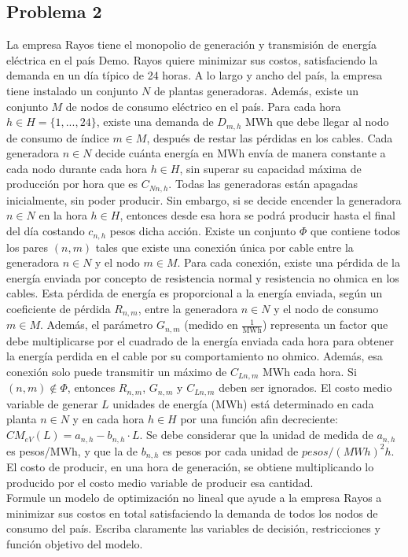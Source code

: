 \documentclass{article}
\begin{document}
\begin{flushleft}
		\section{Problema 2}
		La empresa Rayos tiene el monopolio de generación y transmisión de energía eléctrica en el país Demo. Rayos quiere minimizar sus costos, satisfaciendo la demanda en un día típico de 24 horas. A lo largo y ancho del país, la empresa tiene instalado un conjunto $N$ de plantas generadoras. Además, existe un conjunto $M$ de nodos de consumo eléctrico en el país. Para cada hora $h \in H = \{1, ..., 24\}$, existe una demanda de $D_{m,h}$ MWh que debe llegar al nodo de consumo de índice $m \in M$, después de restar las pérdidas en los cables. Cada generadora $n \in N$ decide cuánta energía en MWh envía de manera constante a cada nodo durante cada hora $h \in H$, sin superar su capacidad máxima de producción por hora que es $C_{Nn,h}$. Todas las generadoras están apagadas inicialmente, sin poder producir. Sin embargo, si se decide encender la generadora $n \in N$ en la hora $h \in H$, entonces desde esa hora se podrá producir hasta el final del día costando $c_{n,h}$ pesos dicha acción. Existe un conjunto $\Phi$ que contiene todos los pares $(n, m)$ tales que existe una conexión única por cable entre la generadora $n \in N$ y el nodo $m \in M$. Para cada conexión, existe una pérdida de la energía enviada por concepto de resistencia normal y resistencia no ohmica en los cables. Esta pérdida de energía es proporcional a la energía enviada, según un coeficiente de pérdida $R_{n,m}$, entre la generadora $n \in N$ y el nodo de consumo $m \in M$. Además, el parámetro $G_{n,m}$ (medido en $\frac{1}{\text{MWh}}$) representa un factor que debe multiplicarse por el cuadrado de la energía enviada cada hora para obtener la energía perdida en el cable por su comportamiento no ohmico. Además, esa conexión solo puede transmitir un máximo de $C_{Ln,m}$ MWh cada hora. Si $(n, m) \notin \Phi$, entonces $R_{n,m}$, $G_{n,m}$ y $C_{Ln,m}$ deben ser ignorados. El costo medio variable de generar $L$ unidades de energía (MWh) está determinado en cada planta $n \in N$ y en cada hora $h \in H$ por una función afin decreciente: $CM_{eV}(L) = a_{n,h} - b_{n,h} \cdot L$. Se debe considerar que la unidad de medida de $a_{n,h}$ es pesos/MWh, y que la de $b_{n,h}$ es pesos por cada unidad de $pesos/(MWh)^2h$. El costo de producir, en una hora de generación, se obtiene multiplicando lo producido por el costo medio variable de producir esa cantidad.\\
		\vspace{5mm}
		Formule un modelo de optimización no lineal que ayude a la empresa Rayos a minimizar sus costos en total satisfaciendo la demanda de todos los nodos de consumo del país. Escriba claramente las variables de decisión, restricciones y función objetivo del modelo.\\
		

\end{flushleft}
\end{document}
